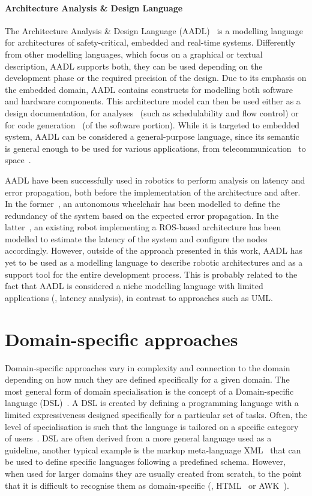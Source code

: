 \paragraph{Architecture Analysis \& Design Language} The  Architecture Analysis \& Design Language (AADL)~\cite{feiler2006architecture} is a modelling language for architectures of safety-critical, embedded and real-time systems. Differently from other modelling languages, which focus on a graphical or textual description, AADL supports both, they can be used depending on the development phase or the required precision of the design. Due to its emphasis on the embedded domain, AADL contains constructs for modelling both software and hardware components. This architecture model can then be used either as a design documentation, for analyses~\cite{feiler2004open} (such as schedulability and flow control) or for code generation~\cite{hugues2008prototype} (of the software portion). While it is targeted to embedded system, AADL can be considered a general-purpose language, since its semantic is general enough to be used for various applications, from telecommunication~\cite{delanote2008using} to space~\cite{perrotin2011taste}.

AADL have been successfully used in robotics to perform analysis on latency and error propagation, both before the implementation of the architecture and after. In the former~\cite{biggs2014modelling}, an autonomous wheelchair has been modelled to define the redundancy of the system based on the expected error propagation. In the latter~\cite{larsen2016modelling}, an existing robot implementing a ROS-based architecture has been modelled to estimate the latency of the system and configure the nodes accordingly. However, outside of the approach presented in this work, AADL has yet to be used as a modelling language to describe robotic architectures and as a support tool for the entire development process. This is probably related to the fact that AADL is considered a niche modelling language with limited applications (\eg, latency analysis), in contrast to approaches such as UML.

\section{Domain-specific approaches}
Domain-specific approaches vary in complexity and connection to the domain depending on how much they are defined specifically for a given domain. The most general form of domain specialisation is the concept of a Domain-specific language (DSL)~\cite{fowler2010domain}.  A DSL is created by defining a programming language with a limited expressiveness designed specifically for a particular set of tasks. Often, the level of specialisation is such that the language is tailored on a specific category of users~\cite{voelter2013dsl}. DSL are often derived from a more general language used as a guideline, another typical example is the markup meta-language XML~\cite{harold1998xml} that can be used to define specific languages following a predefined schema. However, when used for larger domains they are usually created from scratch, to the point that it is difficult to recognise them as domain-specific (\eg, HTML~\cite{graham1995html} or AWK~\cite{dougherty1997sed}).

